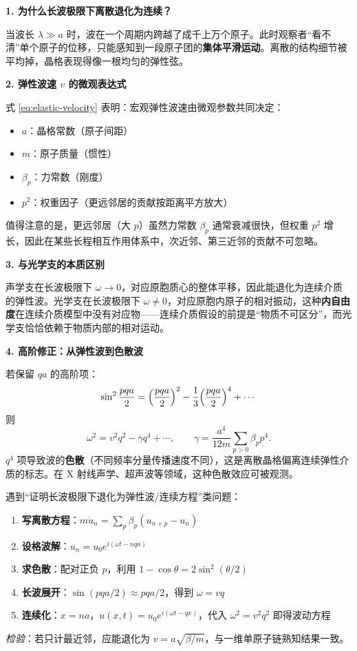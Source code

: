 \begin{insightbox}[物理图像与概念深化]
\textbf{1. 为什么长波极限下离散退化为连续？}

当波长 $\lambda\gg a$ 时，波在一个周期内跨越了成千上万个原子。此时观察者``看不清''单个原子的位移，只能感知到一段原子团的\textbf{集体平滑运动}。离散的结构细节被平均掉，晶格表现得像一根均匀的弹性弦。

\textbf{2. 弹性波速 $v$ 的微观表达式}

式 \eqref{eq:elastic-velocity} 表明：宏观弹性波速由微观参数共同决定：
\begin{itemize}
    \item $a$：晶格常数（原子间距）
    \item $m$：原子质量（惯性）
    \item $\beta_p$：力常数（刚度）
    \item $p^2$：权重因子（更远邻居的贡献按距离平方放大）
\end{itemize}
值得注意的是，更远邻居（大 $p$）虽然力常数 $\beta_p$ 通常衰减很快，但权重 $p^2$ 增长，因此在某些长程相互作用体系中，次近邻、第三近邻的贡献不可忽略。

\textbf{3. 与光学支的本质区别}

声学支在长波极限下 $\omega\to0$，对应原胞质心的整体平移，因此能退化为连续介质的弹性波。光学支在长波极限下 $\omega\neq0$，对应原胞内原子的相对振动，这种\textbf{内自由度}在连续介质模型中没有对应物——连续介质假设的前提是``物质不可区分''，而光学支恰恰依赖于物质内部的相对运动。

\textbf{4. 高阶修正：从弹性波到色散波}

若保留 $qa$ 的高阶项：
\begin{equation}
\sin^2\frac{pqa}{2} = \Bigl(\frac{pqa}{2}\Bigr)^2 - \frac{1}{3}\Bigl(\frac{pqa}{2}\Bigr)^4 + \cdots
\end{equation}
则
\begin{equation}
\omega^2 = v^2 q^2 - \gamma q^4 + \cdots, \qquad \gamma = \frac{a^4}{12m}\sum_{p>0}\beta_p p^4.
\end{equation}
$q^4$ 项导致波的\textbf{色散}（不同频率分量传播速度不同），这是离散晶格偏离连续弹性介质的标志。在 X 射线声学、超声波等领域，这种色散效应可被观测。
\end{insightbox}

\begin{thinkbox}
遇到``证明长波极限下退化为弹性波/连续方程''类问题：
\begin{enumerate}
    \item \textbf{写离散方程}：$m\ddot u_n = \sum_p \beta_p(u_{n+p}-u_n)$
    \item \textbf{设格波解}：$u_n = u_0 e^{i(\omega t-nqa)}$
    \item \textbf{求色散}：配对正负 $p$，利用 $1-\cos\theta=2\sin^2(\theta/2)$
    \item \textbf{长波展开}：$\sin(pqa/2)\approx pqa/2$，得到 $\omega=vq$
    \item \textbf{连续化}：$x=na$，$u(x,t)=u_0 e^{i(\omega t-qx)}$，代入 $\omega^2=v^2q^2$ 即得波动方程
\end{enumerate}
\textit{检验}：若只计最近邻，应能退化为 $v=a\sqrt{\beta/m}$，与一维单原子链熟知结果一致。
\end{thinkbox}
